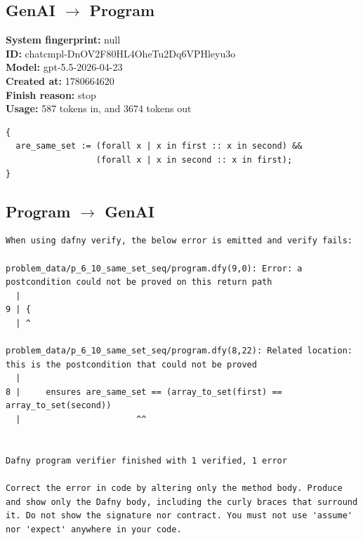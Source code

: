 \documentclass{article}
\begin{document}
\subsection*{GenAI $\rightarrow$ Program}
\textbf{System fingerprint: }null
\\\textbf{ID: }chatcmpl-DnOV2F80HL4OheTu2Dq6VPHleyu3o
\\\textbf{Model: }gpt-5.5-2026-04-23
\\\textbf{Created at: }1780664620
\\\textbf{Finish reason: }stop
\\\textbf{Usage: }587 tokens in, and 3674 tokens out
\begin{lstlisting}
{
  are_same_set := (forall x | x in first :: x in second) &&
                  (forall x | x in second :: x in first);
}
\end{lstlisting}
\subsection*{Program $\rightarrow$ GenAI}
\begin{lstlisting}
When using dafny verify, the below error is emitted and verify fails:

problem_data/p_6_10_same_set_seq/program.dfy(9,0): Error: a postcondition could not be proved on this return path
  |
9 | {
  | ^

problem_data/p_6_10_same_set_seq/program.dfy(8,22): Related location: this is the postcondition that could not be proved
  |
8 | 	ensures are_same_set == (array_to_set(first) == array_to_set(second))
  |                       ^^


Dafny program verifier finished with 1 verified, 1 error

Correct the error in code by altering only the method body. Produce and show only the Dafny body, including the curly braces that surround it. Do not show the signature nor contract. You must not use 'assume' nor 'expect' anywhere in your code.
\end{lstlisting}
\end{document}

